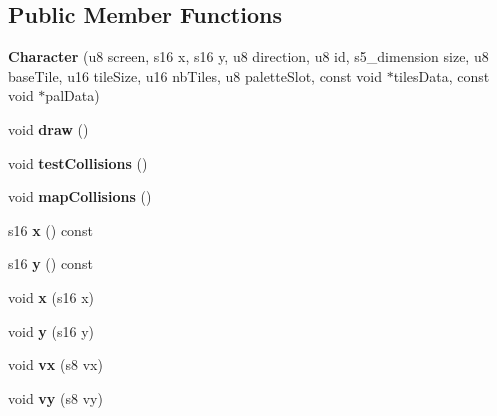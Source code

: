 \subsection*{Public Member Functions}
\begin{DoxyCompactItemize}
\item 
\hypertarget{classCharacter_a091f2955cac2fc5ae17af8013f4eb852}{{\bfseries Character} (u8 screen, s16 x, s16 y, u8 direction, u8 id, s5\+\_\+dimension size, u8 base\+Tile, u16 tile\+Size, u16 nb\+Tiles, u8 palette\+Slot, const void $\ast$tiles\+Data, const void $\ast$pal\+Data)}\label{classCharacter_a091f2955cac2fc5ae17af8013f4eb852}

\item 
\hypertarget{classCharacter_a45a63f9c964bc8286f691fa3eec7ad77}{void {\bfseries draw} ()}\label{classCharacter_a45a63f9c964bc8286f691fa3eec7ad77}

\item 
\hypertarget{classCharacter_a0f8b3a43420b0fda18d7898bdfca4c2a}{void {\bfseries test\+Collisions} ()}\label{classCharacter_a0f8b3a43420b0fda18d7898bdfca4c2a}

\item 
\hypertarget{classCharacter_a03a3141917ed01abbc72f4c057593bca}{void {\bfseries map\+Collisions} ()}\label{classCharacter_a03a3141917ed01abbc72f4c057593bca}

\item 
\hypertarget{classCharacter_a5dbb3462c702f6a9868dece29d45577e}{s16 {\bfseries x} () const }\label{classCharacter_a5dbb3462c702f6a9868dece29d45577e}

\item 
\hypertarget{classCharacter_a08197f0e29e3f9205bb2d222892ace20}{s16 {\bfseries y} () const }\label{classCharacter_a08197f0e29e3f9205bb2d222892ace20}

\item 
\hypertarget{classCharacter_a779caba22388ce362606de54b0aa339d}{void {\bfseries x} (s16 x)}\label{classCharacter_a779caba22388ce362606de54b0aa339d}

\item 
\hypertarget{classCharacter_a256a7f5bdb12bc7a4290cbddb37a9c24}{void {\bfseries y} (s16 y)}\label{classCharacter_a256a7f5bdb12bc7a4290cbddb37a9c24}

\item 
\hypertarget{classCharacter_a634313e1305254c233a0d40f513eac0f}{void {\bfseries vx} (s8 vx)}\label{classCharacter_a634313e1305254c233a0d40f513eac0f}

\item 
\hypertarget{classCharacter_a48707c906c6fd3cc4327aa71479cc7f0}{void {\bfseries vy} (s8 vy)}\label{classCharacter_a48707c906c6fd3cc4327aa71479cc7f0}

\end{DoxyCompactItemize}
